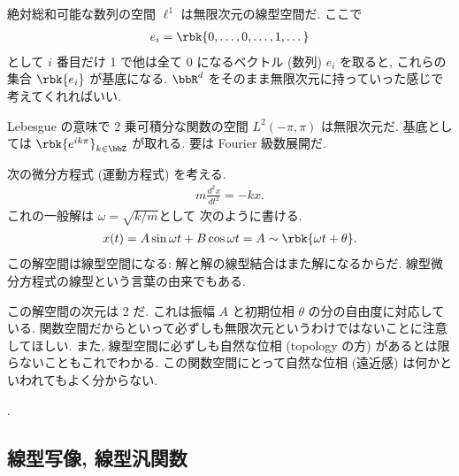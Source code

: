 \documentclass[openany, a4paper, oneside]{jsbook}
\begin{document}
{\begin{ex}[数列空間]
絶対総和可能な数列の空間 $\ell^1$ は無限次元の線型空間だ.
ここで
\begin{align}
 e_i
 =
 \rbk{0, \dots, 0, \dots, 1, \dots}
\end{align}
として $i$ 番目だけ 1 で他は全て 0 になるベクトル (数列) $e_i$ を取ると,
これらの集合 $\rbk{e_i}$ が基底になる.
$\bbR^d$ をそのまま無限次元に持っていった感じで考えてくれればいい.
\end{ex}
\begin{ex}[無限次元の関数空間]
Lebesgue の意味で 2 乗可積分な関数の空間 $L^2 (- \pi, \pi)$ は無限次元だ.
基底としては $\rbk{e^{i k \pi}}_{k \in \bbZ}$ が取れる.
要は Fourier 級数展開だ.
\end{ex}
\begin{ex}
次の微分方程式 (運動方程式) を考える.
\begin{align}
 m \frac{d^2 x}{dt^2}
 =
 -k x.
\end{align}
これの一般解は $\omega = \sqrt{k / m}$として 次のように書ける.
\begin{align}
 x(t)
 =
 A \sin \omega t + B \cos \omega t
 =
 A \sim \rbk{\omega t + \theta}.
\end{align}
この解空間は線型空間になる: 解と解の線型結合はまた解になるからだ.
線型微分方程式の線型という言葉の由来でもある.

この解空間の次元は 2 だ.
これは振幅 $A$ と初期位相 $\theta$ の分の自由度に対応している.
関数空間だからといって必ずしも無限次元というわけではないことに注意してほしい.
また, 線型空間に必ずしも自然な位相 (topology の方) があるとは限らないこともこれでわかる.
この関数空間にとって自然な位相 (遠近感) は何かといわれてもよく分からない.
\end{ex}}.
\subsection{線型写像, 線型汎関数}
\end{document}
